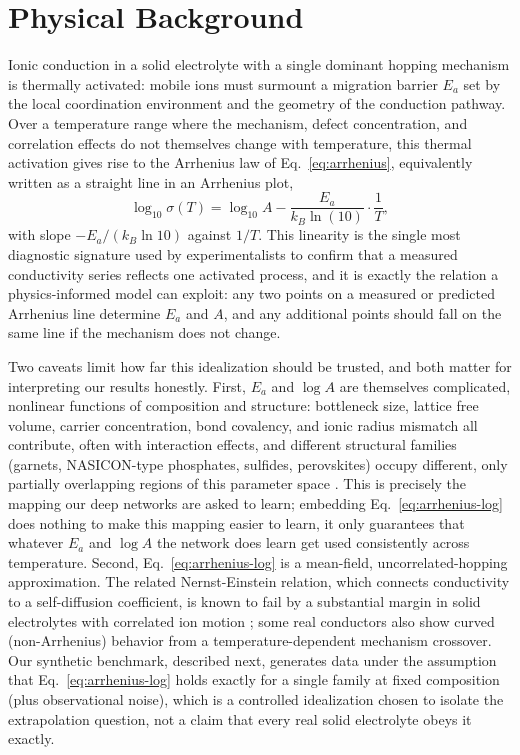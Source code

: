 \documentclass[11pt]{article}
\begin{document}
\section{Physical Background}
\label{sec:physics}

Ionic conduction in a solid electrolyte with a single dominant hopping mechanism is thermally activated: mobile ions must surmount a migration barrier $E_a$ set by the local coordination environment and the geometry of the conduction pathway. Over a temperature range where the mechanism, defect concentration, and correlation effects do not themselves change with temperature, this thermal activation gives rise to the Arrhenius law of Eq.~\ref{eq:arrhenius}, equivalently written as a straight line in an Arrhenius plot,
\begin{equation}
\log_{10}\sigma(T) = \log_{10}A - \frac{E_a}{k_B \ln(10)}\cdot\frac{1}{T},
\label{eq:arrhenius-log}
\end{equation}
with slope $-E_a / (k_B \ln 10)$ against $1/T$. This linearity is the single most diagnostic signature used by experimentalists to confirm that a measured conductivity series reflects one activated process, and it is exactly the relation a physics-informed model can exploit: any two points on a measured or predicted Arrhenius line determine $E_a$ and $A$, and any additional points should fall on the same line if the mechanism does not change.

Two caveats limit how far this idealization should be trusted, and both matter for interpreting our results honestly. First, $E_a$ and $\log A$ are themselves complicated, nonlinear functions of composition and structure: bottleneck size, lattice free volume, carrier concentration, bond covalency, and ionic radius mismatch all contribute, often with interaction effects, and different structural families (garnets, NASICON-type phosphates, sulfides, perovskites) occupy different, only partially overlapping regions of this parameter space \citep{famprikis2019fundamentals}. This is precisely the mapping our deep networks are asked to learn; embedding Eq.~\ref{eq:arrhenius-log} does nothing to make this mapping easier to learn, it only guarantees that whatever $E_a$ and $\log A$ the network does learn get used consistently across temperature. Second, Eq.~\ref{eq:arrhenius-log} is a mean-field, uncorrelated-hopping approximation. The related Nernst-Einstein relation, which connects conductivity to a self-diffusion coefficient, is known to fail by a substantial margin in solid electrolytes with correlated ion motion \citep{marcolongo2017nernsteinstein}; some real conductors also show curved (non-Arrhenius) behavior from a temperature-dependent mechanism crossover. Our synthetic benchmark, described next, generates data under the assumption that Eq.~\ref{eq:arrhenius-log} holds exactly for a single family at fixed composition (plus observational noise), which is a controlled idealization chosen to isolate the extrapolation question, not a claim that every real solid electrolyte obeys it exactly.
\end{document}
